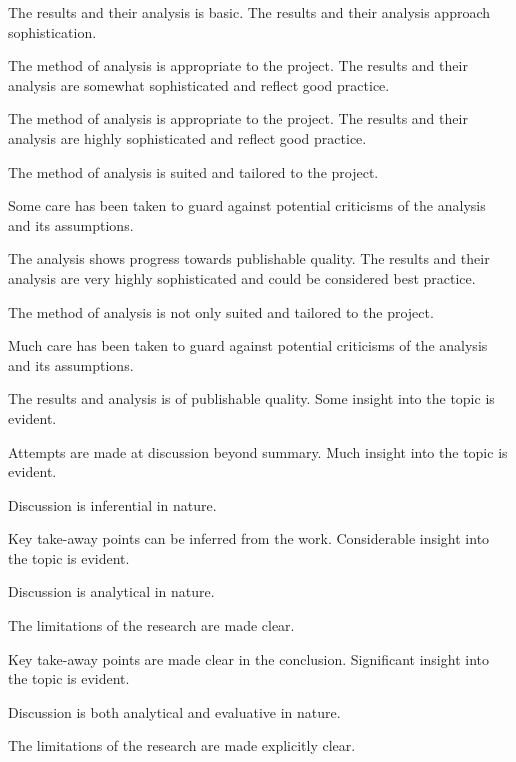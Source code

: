 \begin{markingrubric}
%
        \grade\fail 
        \grade 		The results and their analysis is basic.
        \grade 		The results and their analysis approach sophistication.
        \par 		The method of analysis is appropriate to the project.
        \grade 		The results and their analysis are somewhat sophisticated and reflect good practice.
        \par 		The method of analysis is appropriate to the project.
        \grade 		The results and their analysis are highly sophisticated and reflect good practice.
        \par 		The method of analysis is suited and tailored to the project.
       \par 		Some care has been taken to guard against potential criticisms of the analysis and its assumptions.
        \par		The analysis shows progress towards publishable quality.
        \grade 		The results and their analysis are very highly sophisticated and could be considered best practice.
        \par 		The method of analysis is not only suited and tailored to the project.
        \par 		Much care has been taken to guard against potential criticisms of the analysis and its assumptions.
        \par		The results and analysis is of publishable quality.
%
        \grade\fail 
        \grade		Some insight into the topic is evident.
        \par		Attempts are made at discussion beyond summary.
        \grade		Much insight into the topic is evident.
        \par		Discussion is inferential in nature.
        \par		Key take-away points can be inferred from the work.
        \grade		Considerable insight into the topic is evident.
        \par		Discussion is analytical in nature.
        \par		The limitations of the research are made clear.
        \par		Key take-away points are made clear in the conclusion.
        \grade		Significant  insight into the topic is evident.
        \par		Discussion is both analytical and evaluative in nature.
        \par		The limitations of the research are made explicitly clear.

\end{markingrubric}
